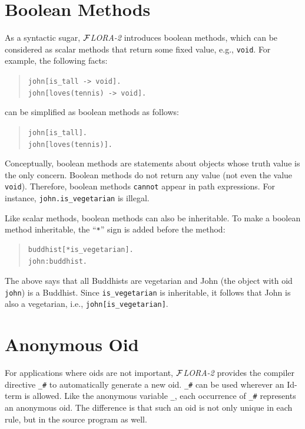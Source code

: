 \documentclass[11pt]{article}
\newcommand{\FLORA}{{\mbox{${\cal F}${\small\it LORA}\rm\emph{-2}}}\xspace}
\begin{document}
\section{Boolean Methods}


%
As a syntactic sugar, \FLORA introduces boolean methods, which can be
considered as scalar methods that return some fixed value, e.g.,
{\tt void}. For example, the following facts:
\begin{quote}
\verb|john[is_tall -> void].| \\
\verb|john[loves(tennis) -> void].|
\end{quote}
can be simplified as boolean methods as follows:
\begin{quote}
\verb|john[is_tall].| \\
\verb|john[loves(tennis)].|
\end{quote}

Conceptually, boolean methods are statements about objects whose truth
value is the only concern. Boolean methods do not return any value (not
even the value {\tt void}). Therefore, boolean methods {\tt cannot} appear
in path expressions. For instance, \mbox{\tt john.is\_vegetarian} is
illegal.

Like scalar methods, boolean methods can also be inheritable. To make a
boolean method inheritable, the ``\verb|*|'' sign is added before
the method:
\begin{quote}
\begin{verbatim}
buddhist[*is_vegetarian].
john:buddhist.
\end{verbatim}
\end{quote}
The above says that all Buddhists are vegetarian and John (the object with
oid {\tt john}) is a Buddhist. Since \verb|is_vegetarian| is inheritable,
it follows that John is also a vegetarian, i.e.,
\verb|john[is_vegetarian]|.


\section{Anonymous Oid}


%
For applications where oids are not important, \FLORA provides the
compiler directive \verb|_#| to automatically generate a new
oid. \verb|_#| can be used wherever an Id-term is allowed. Like the
anonymous variable \verb|_|, each occurrence of \verb|_#| represents
an anonymous oid. The difference is that such an oid is not only
unique in each rule, but in the source program as well.
\end{document}
